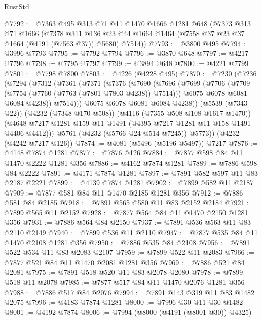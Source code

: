 \begin{lexlean}{RustStd}
\begin{coremodule}
@7792 := @7363
    @495
    @313
    @71
    @11
    @1470
    @1666
    @1281
    @648
    (@7373
      @313
      @71
      @1666
      (@7378
        @311
        @136
        @23
        @44
        @1664
        @1464
        (@7558 @37 @23 @37 @1664 (@4191 (@7563 @37)) @5680)
        @7514))
@7793 := @3800 @495
@7794 := @3996 @7793
@7795 := @7792 @7794
@7796 := @3870 @648
@7797 := @4217 @7796
@7798 := @7795 @7797
@7799 := @3894 @648
@7800 := @4221 @7799
@7801 := @7798 @7800
@7803 := @4226 (@4228 @495)
@7870 := @7230
    (@7236
      (@7294
        (@7312
          (@7361
            (@7371
              (@7376
                (@7690
                  (@7696
                    (@7699
                      (@7706
                        (@7709 (@7754 (@7760 (@7763 (@7801 @7803 @4238)) @7514)))
                        @6075
                        @6078
                        @6081
                        @6084
                        @4238))
                    @7514)))
              @6075
              @6078
              @6081
              @6084
              @4238))
          (@5539 (@7343 @22))
          (@4232 (@7348 @170 @508))
          (@4116 (@7355 @508 @108 @1617 @1470))
          (@4648 @7217 @1281 @159 @11 @1491 (@4395 @7217 @1281 @11 @158 @1491 @4406 @4412)))
        @5761
        (@4232 (@5766 @24 @514 @7245))
        @5773))
    (@4232 (@4242 @7217 @126))
@7874 := @4081 (@5496 (@5196 @5497)) @7217
@7876 := @4148 @7874 @1281
@7877 := @7876 @126
@7884 := @7877 @598 @84 @11 @1470 @2222 @1281 @356
@7886 := @4162 @7874 @1281
@7889 := @7886 @598 @84 @2222
@7891 := @4171 @7874 @1281
@7897 := @7891 @582 @597 @11 @83 @2187 @2221
@7899 := @4139 @7874 @1281
@7902 := @7899 @582 @11 @2187
@7909 := @7877 @581 @84 @11 @1470 @2185 @1281 @356
@7912 := @7886 @581 @84 @2185
@7918 := @7891 @565 @580 @11 @83 @2152 @2184
@7921 := @7899 @565 @11 @2152
@7928 := @7877 @564 @84 @11 @1470 @2150 @1281 @356
@7931 := @7886 @564 @84 @2150
@7937 := @7891 @536 @563 @11 @83 @2110 @2149
@7940 := @7899 @536 @11 @2110
@7947 := @7877 @535 @84 @11 @1470 @2108 @1281 @356
@7950 := @7886 @535 @84 @2108
@7956 := @7891 @522 @534 @11 @83 @2083 @2107
@7959 := @7899 @522 @11 @2083
@7966 := @7877 @521 @84 @11 @1470 @2081 @1281 @356
@7969 := @7886 @521 @84 @2081
@7975 := @7891 @518 @520 @11 @83 @2078 @2080
@7978 := @7899 @518 @11 @2078
@7985 := @7877 @517 @84 @11 @1470 @2076 @1281 @356
@7988 := @7886 @517 @84 @2076
@7994 := @7891 @143 @319 @11 @83 @1482 @2075
@7996 := @4183 @7874 @1281
@8000 := @7996 @30 @11 @30 @1482
@8001 := @4192 @7874
@8006 := @7994 (@8000 (@4191 (@8001 @30)) @4325)

\end{coremodule}
\end{lexlean}

